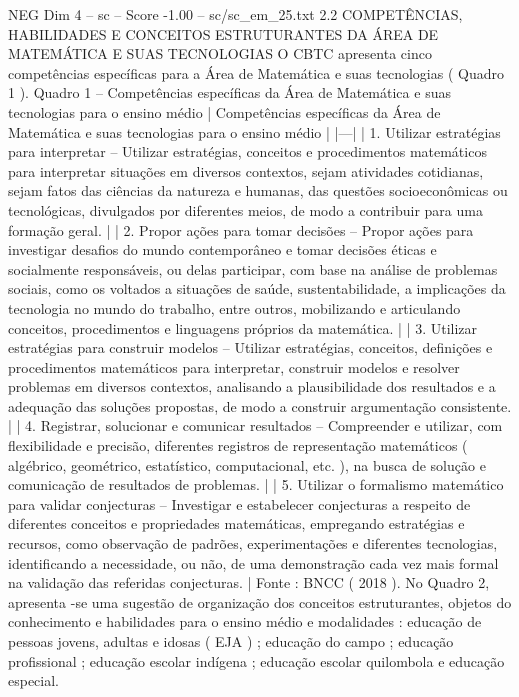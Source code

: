 \begin{textsample}{NEG Dim 4 – sc – Score -1.00 – sc/sc\_em\_25.txt}  \label{ex:f4_neg_260}
2.2 COMPETÊNCIAS, HABILIDADES E CONCEITOS ESTRUTURANTES DA ÁREA DE MATEMÁTICA E SUAS TECNOLOGIAS O CBTC apresenta cinco competências específicas para a Área de Matemática e suas tecnologias ( Quadro 1 ).
Quadro 1 – Competências específicas da Área de Matemática e suas tecnologias para o ensino médio | Competências específicas da Área de Matemática e suas tecnologias para o ensino médio | |---| | 1.
Utilizar estratégias para interpretar – Utilizar estratégias, conceitos e procedimentos matemáticos para interpretar situações em diversos contextos, sejam atividades cotidianas, sejam fatos das ciências da natureza e humanas, das questões socioeconômicas ou tecnológicas, divulgados por diferentes meios, de modo a contribuir para uma formação geral. | | 2.
Propor ações para tomar decisões – Propor ações para investigar desafios do mundo contemporâneo e tomar decisões éticas e socialmente responsáveis, ou delas participar, com base na análise de problemas sociais, como os voltados a situações de saúde, sustentabilidade, a implicações da tecnologia no mundo do trabalho, entre outros, mobilizando e articulando conceitos, procedimentos e linguagens próprios da matemática. | | 3.
Utilizar estratégias para construir modelos – Utilizar estratégias, conceitos, definições e procedimentos matemáticos para interpretar, construir modelos e resolver problemas em diversos contextos, analisando a plausibilidade dos resultados e a adequação das soluções propostas, de modo a construir argumentação consistente. | | 4.
Registrar, solucionar e comunicar resultados – Compreender e utilizar, com flexibilidade e precisão, diferentes registros de representação matemáticos ( algébrico, geométrico, estatístico, computacional, etc. ), na busca de solução e comunicação de resultados de problemas. | | 5.
Utilizar o formalismo matemático para validar conjecturas – Investigar e estabelecer conjecturas a respeito de diferentes conceitos e propriedades matemáticas, empregando estratégias e recursos, como observação de padrões, experimentações e diferentes tecnologias, identificando a necessidade, ou não, de uma demonstração cada vez mais formal na validação das referidas conjecturas. | Fonte : BNCC ( 2018 ).
No Quadro 2, apresenta -se uma sugestão de organização dos conceitos estruturantes, objetos do conhecimento e habilidades para o ensino médio e modalidades : educação de pessoas jovens, adultas e idosas ( EJA ) ; educação do campo ; educação profissional ; educação escolar indígena ; educação escolar quilombola e educação especial.

\end{textsample}
